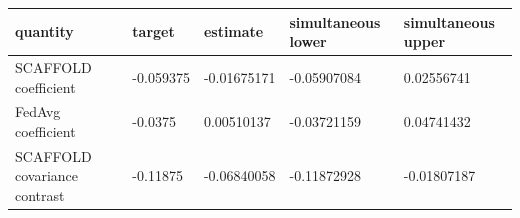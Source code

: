 \begin{tabular}{lllll}
quantity & target & estimate & simultaneous lower & simultaneous upper \\
\hline
SCAFFOLD coefficient & -0.059375 & -0.01675171 & -0.05907084 & 0.02556741 \\
FedAvg coefficient & -0.0375 & 0.00510137 & -0.03721159 & 0.04741432 \\
SCAFFOLD covariance contrast & -0.11875 & -0.06840058 & -0.11872928 & -0.01807187 \\
\end{tabular}
